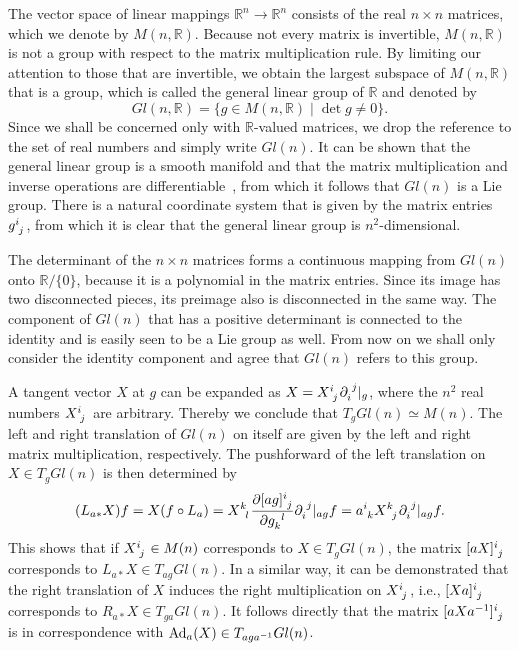 \documentclass[
final,
11pt,
a4paper,
DIV=11,
headinclude=true,
footinclude=false,
bibliography=totoc,
twoside=true,  %
BCOR=5mm
]{scrbook}
\begin{document}
The vector space of linear mappings $\mathds{R}^n \to 
\mathds{R}^n$ consists of the real $n \times n$ matrices, which 
we denote by $M(n,\mathds{R})$. Because not every matrix is 
invertible, $M(n,\mathds{R})$ is not a group with respect to the 
matrix multiplication rule. By limiting our attention to those 
that are invertible, we obtain the largest subspace of 
$M(n,\mathds{R})$ that is a group, which is called the general 
linear group of $\mathds{R}$ and denoted by
\begin{equation*}
  Gl(n,\mathds{R}) = \{ g \in M(n,\mathds{R}) \mid \det g \neq 
  0 \}.
\end{equation*}
Since we shall be concerned only with $\mathds{R}$-valued 
matrices, we drop the reference to the set of real numbers and 
simply write $Gl(n)$. It can be shown that the general linear 
group is a smooth manifold and that the matrix multiplication and 
inverse operations are differentiable~\cite{sharpe1997diff_geo}, 
from which it follows that $Gl(n)$ is a Lie group. There is a 
natural coordinate system that is given by the matrix entries 
$g\ind{^i_j}$, from which it is clear that the general linear 
group is $n^2$-dimensional.

The determinant of the $n \times n$ matrices forms a continuous 
mapping from $Gl(n)$ onto $\mathds{R}/\{0\}$, because it is a 
polynomial in the matrix entries. Since its image has two 
disconnected pieces, its preimage also is disconnected in the 
same way. The component of $Gl(n)$ that has a positive 
determinant is connected to the identity and is easily seen to be 
a Lie group as well.  From now on we shall only consider the 
identity component and agree that $Gl(n)$ refers to this group.

A tangent vector $X$ at $g$ can be expanded as $X = 
X\ind{^i_j}\pd\ind{_i^j}|_g$, where the $n^2$ real numbers 
$X\ind{^i_j}$ are arbitrary. Thereby we conclude that $T_g Gl(n) 
\simeq M(n)$. The left and right translation of $Gl(n)$ on itself 
are given by the left and right matrix multiplication, 
respectively. The pushforward of the left translation on $X \in 
T_g Gl(n)$ is then determined by
\begin{equation*}
  (L_{a*}X)f = X(f\circ L_a)
  = X\ind{^k_l} \frac{\pd[ag]\ind{^i_j}}{\pd g\ind{_k^l}} 
  \pd\ind{_i^j}|_{ag} f
  = a\ind{^i_k} X\ind{^k_j} \pd\ind{_i^j}|_{ag} f.
\end{equation*}
This shows that if $X\ind{^i_j} \in M(n)$ corresponds to $X \in 
T_g Gl(n)$, the matrix $[aX]\ind{^i_j}$ corresponds to $L_{a*}X 
\in T_{ag}Gl(n)$. In a similar way, it can be demonstrated that 
the right translation of $X$ induces the right multiplication on 
$X\ind{^i_j}$, i.e., $[Xa]\ind{^i_j}$ corresponds to $R_{a*}X \in 
T_{ga}Gl(n)$. It follows directly that the matrix 
$[aXa^{-1}]\ind{^i_j}$ is in correspondence with $\operatorname{Ad}_a(X) \in 
T_{aga^{-1}}Gl(n)$.
\end{document}
